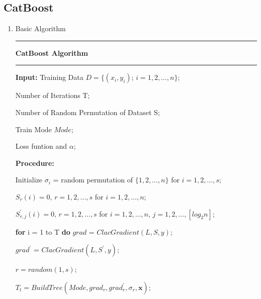 \documentclass[a4paper]{article}
\begin{document}
	\subsection{CatBoost}
		\begin{enumerate}
			\item Basic Algorithm\par
				\noindent\rule[0.10\baselineskip]{\textwidth}{0.75pt}
				\textbf{CatBoost Algorithm}\\
				\noindent\rule[0.10\baselineskip]{\textwidth}{0.5pt}
				\textbf{Input:} Training Data $D=\{(x_i,y_i);\, i = 1,2,\dots, n\};$\par
						\hspace*{32pt} Number of Iterations T;\par
						\hspace*{32pt} Number of Random Permutation of Dataset S;\par
						\hspace*{32pt} Train Mode $Mode$;\par
						\hspace*{32pt} Loss funtion and $\alpha$;\par
						\textbf{Procedure:}\par
						\hspace*{32pt} Initialize $\sigma_i$ = random permutation of $\{1,2,\dots,n\}$ for $i=1,2,\dots,s$;\par
						\hspace*{32pt} $S_r(i) = 0,\,r = 1,2,\dots,s$ for $i=1,2,\dots,n$;\par
						\hspace*{32pt} $S_{r,j}^{'}(i) = 0,\,r = 1,2,\dots,s$ for $i=1,2,\dots,n$, $j = 1, 2,\dots, [log_2n]$;\par
						\hspace*{32pt} \textbf{for} i = 1 to T \textbf{do}
						\hspace*{48pt} $grad$ = $ClacGradient(L, S, y);$\par
						\hspace*{48pt} $grad^{'}$ = $ClacGradient(L, S^{'}, y);$\par
						\hspace*{48pt} $r = random(1,s)$;\par
						\hspace*{48pt} $T_t = BuildTree(Mode, grad_r, grad_r^{'},\sigma_r, \textbf{x})$;\par

\end{enumerate}
\end{document}
